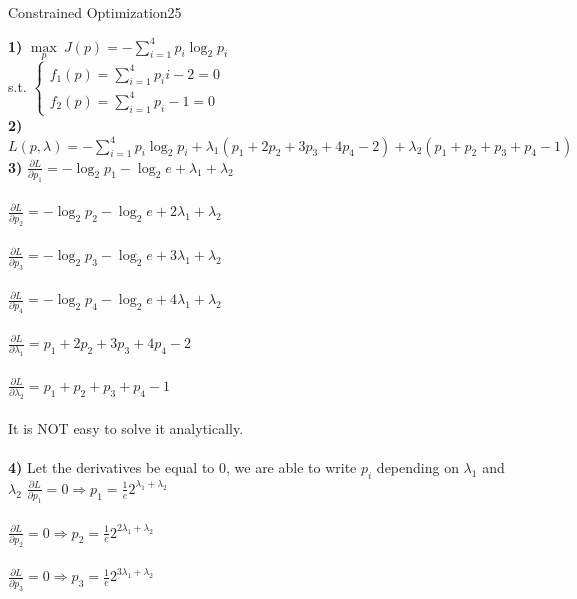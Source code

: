 \begin{questions}
\begin{question}{Constrained Optimization}{25}
\begin{answer}
\textbf{1)}
$ \max\limits_{p} \ J(p) = - \sum\limits_{i=1}^{4}p_i\log_2 p_{i} $\\
s.t.
\begin{math}
\begin{cases}
 f_{1}(p) = \sum\limits_{i=1}^{4} p_{i}i  -2=0 \\f_{2}(p) = \sum\limits_{i=1}^{4} p_{i} -1= 0
\end{cases}
\end{math}\\
\textbf{2)}
\begin{math}
L(p,\lambda) = -\sum\limits_{i=1}^{4} p_{i} \log_2 p_{i}+\lambda_{1}(p_{1}+2p_{2}+3p_{3}+4p_{4}-2)+\lambda_{2}(p_{1}+p_{2}+p_{3}+p_{4}-1) 
\end{math}
\\
\textbf{3)} 
$ \frac{\partial L}{\partial p_{1}} = -\log_2 p_1 - \log_2 e + \lambda_{1} + \lambda_{2} $ \\ \\
$ \frac{\partial L}{\partial p_{2}} = -\log_2 p_2 - \log_2 e + 2 \lambda_{1} + \lambda_{2} $ \\ \\ 
$ \frac{\partial L}{\partial p_{3}} = -\log_2 p_3 - \log_2 e + 3 \lambda_{1} + \lambda_{2} $ \\ \\
$ \frac{\partial L}{\partial p_{4}} =-\log_2 p_4 - \log_2 e + 4 \lambda_{1} + \lambda_{2} $ \\ \\
$ \frac{\partial L}{\partial \lambda_{1}} = p_{1} + 2 p_{2} + 3 p_{3} + 4 p_{4} - 2  $ \\ \\
$ \frac{\partial L}{\partial \lambda_{2}} = p_{1} + p_{2} + p_{3} + p_{4} - 1 $ \\ \\
It is NOT easy to solve it analytically. \\ \\
\textbf{4)} 
Let the derivatives be equal to 0, we are able to write $p_i $ depending on $\lambda_{1}$ and $\lambda_{2}$
$ \frac{\partial L}{\partial p_{1}} = 0 \Rightarrow p_{1}=\frac{1}{e}2^{\lambda_{1}+\lambda_{2}}$ \\ \\
$ \frac{\partial L}{\partial p_{2}} = 0 \Rightarrow p_{2}=\frac{1}{e}2^{2 \lambda_{1}+\lambda_{2}} $ \\ \\ 
$ \frac{\partial L}{\partial p_{3}} = 0 \Rightarrow p_{3}=\frac{1}{e}2^{3 \lambda_{1}+\lambda_{2}}  $ \\ \\

\end{answer}
\end{question}
\end{questions}

